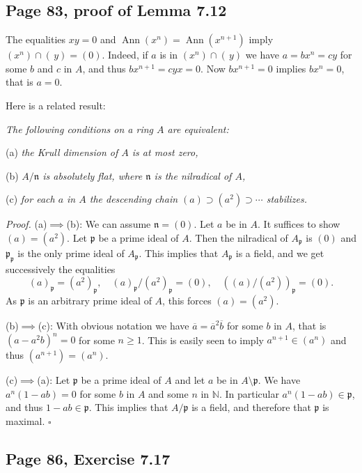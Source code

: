 \documentclass[parskip=half,fontsize=12pt]{scrartcl}%
\newcommand{\oo}{\operatorname}\newcommand{\ooo}{\operatorname*}
\newcommand{\mf}{\mathfrak}
\newcommand{\ppp}{\mf p}
\begin{document}
\subsection{Page 83, proof of Lemma 7.12}%

The equalities $xy=0$ and $\oo{Ann}(x^n)=\oo{Ann}(x^{n+1})$ imply $(x^n)\cap(\,y)=(0)$. Indeed, if $a$ is in $(x^n)\cap(\,y)$ we have $a=bx^n=cy$ for some $b$ and $c$ in $A$, and thus $bx^{n+1}=cyx=0$. Now $bx^{n+1}=0$ implies $bx^n=0$, that is $a=0$. 


Here is a related result:

\emph{The following conditions on a ring $A$ are equivalent:}

(a) \emph{the Krull dimension of $A$ is at most zero,}

(b) \emph{$A/\mf n$ is absolutely flat, where $\mf n$ is the nilradical of $A$,}

(c) \emph{for each $a$ in $A$ the descending chain $(a)\supset(a^2)\supset\cdots$ stabilizes.}

\emph{Proof.} (a)$\implies$(b): We can assume $\mf n=(0)$. Let $a$ be in $A$. It suffices to show $(a)=(a^2)$. Let $\ppp$ be a prime ideal of $A$. Then the nilradical of $A_\ppp$ is $(0)$ and $\ppp_\ppp$ is the only prime ideal of $A_\ppp$. This implies that $A_\ppp$ is a field, and we get successively the equalities 
$$
(a)_\ppp=(a^2)_\ppp,\quad(a)_\ppp/(a^2)_\ppp=(0),\quad((a)/(a^2))_\ppp=(0).
$$ 
As $\ppp$ is an arbitrary prime ideal of $A$, this forces $(a)=(a^2)$.

(b)$\implies$(c): With obvious notation we have $\overline a=\overline a^2\overline b$ for some $b$ in $A$, that is $(a-a^2b)^n=0$ for some $n\ge1$. This is easily seen to imply $a^{n+1}\in(a^n)$ and thus $(a^{n+1})=(a^n)$. 

(c)$\implies$(a): Let $\ppp$ be a prime ideal of $A$ and let $a$ be in $A\setminus\ppp$. We have $a^n(1-ab)=0$ for some $b$ in $A$ and some $n$ in $\mathbb N$. In particular $a^n(1-ab)\in\ppp$, and thus $1-ab\in\ppp$. This implies that $A/\ppp$ is a field, and therefore that $\ppp$ is maximal. $\square$

\subsection{Page 86, Exercise 7.17}%
\end{document}
